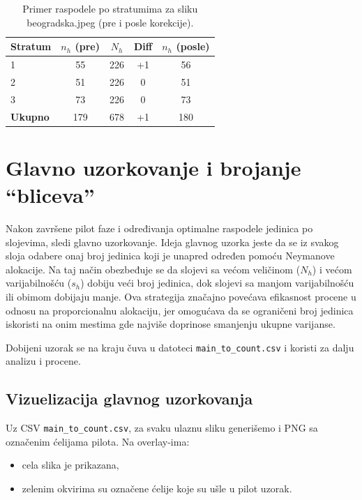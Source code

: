 \documentclass[a4paper,12pt]{article}
\begin{document}
\begin{table}[H]
\centering
\begin{tabular}{lcccc}
\hline
Stratum & $n_h$ (pre) & $N_h$ & Diff & $n_h$ (posle) \\
\hline
1 & 55 & 226 & +1 & 56 \\
2 & 51 & 226 & 0  & 51 \\
3 & 73 & 226 & 0  & 73 \\
\hline
\textbf{Ukupno} & 179 & 678 & +1 & 180 \\
\hline
\end{tabular}
\caption{Primer raspodele po stratumima za sliku beogradska.jpeg (pre i posle korekcije).}
\label{tab:alloc-beogradska}
\end{table}

\section{Glavno uzorkovanje i brojanje “bliceva”}

Nakon završene pilot faze i određivanja optimalne raspodele jedinica po slojevima, 
sledi glavno uzorkovanje. Ideja glavnog uzorka jeste da se iz svakog sloja odabere 
onaj broj jedinica koji je unapred određen pomoću Neymanove alokacije. 
Na taj način obezbeđuje se da slojevi sa većom veličinom ($N_h$) i većom varijabilnošću ($s_h$) 
dobiju veći broj jedinica, dok slojevi sa manjom varijabilnošću ili obimom dobijaju manje. 
Ova strategija značajno povećava efikasnost procene u odnosu na proporcionalnu alokaciju, 
jer omogućava da se ograničeni broj jedinica iskoristi na onim mestima gde najviše doprinose 
smanjenju ukupne varijanse.

Dobijeni uzorak se na kraju čuva u datoteci 
\texttt{main\_to\_count.csv} i koristi za dalju analizu i procene.

\subsection{Vizuelizacija glavnog uzorkovanja}

Uz CSV \texttt{main\_to\_count.csv}, za svaku ulaznu sliku generišemo i PNG sa označenim ćelijama pilota. Na overlay-ima:
\begin{itemize}
	\item cela slika je prikazana,
	\item zelenim okvirima su označene ćelije koje su ušle u pilot uzorak.
\end{itemize}
\end{document}
